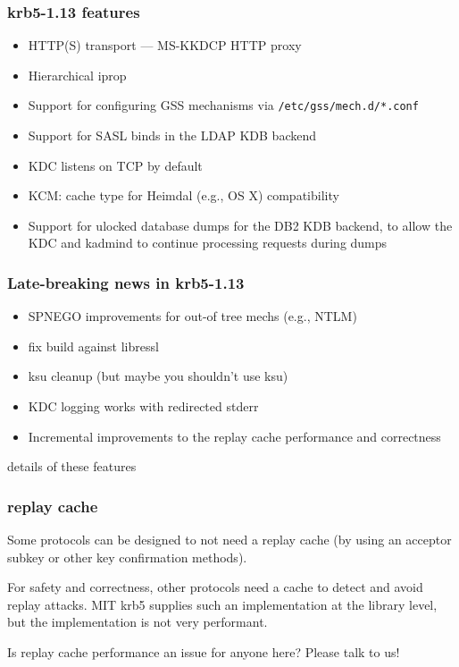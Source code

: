 \documentclass{beamer}
\begin{document}
\begin{frame}[fragile]
\frametitle{krb5-1.13 features}
\begin{itemize}
\item{HTTP(S) transport --- MS-KKDCP HTTP proxy}
\item{Hierarchical iprop}
\item{Support for configuring GSS mechanisms via \verb+/etc/gss/mech.d/*.conf+}
\item{Support for SASL binds in the LDAP KDB backend}
\item{KDC listens on TCP by default}
\item{KCM: cache type for Heimdal (e.g., OS X) compatibility}
\item{Support for ulocked database dumps for the DB2 KDB backend, to allow
	the KDC and kadmind to continue processing requests during dumps}
\end{itemize}
\end{frame}

\begin{frame}
\frametitle{Late-breaking news in krb5-1.13}
\begin{itemize}
\item{SPNEGO improvements for out-of tree mechs (e.g., NTLM)}
\item{fix build against libressl}
\item{ksu cleanup (but maybe you shouldn't use ksu)}
\item{KDC logging works with redirected stderr}
\item{Incremental improvements to the replay cache performance and
	correctness}
\end{itemize}
\end{frame}

\begin{frame}
details of these features
\end{frame}

\begin{frame}
\frametitle{replay cache}
Some protocols can be designed to not need a replay cache (by using
an acceptor subkey or other key confirmation methods).

For safety and correctness, other protocols need a cache to detect and
avoid replay attacks.  MIT krb5 supplies such an implementation at the
library level, but the implementation is not very performant.

Is replay cache performance an issue for anyone here?  Please talk to us!
\end{frame}
\end{document}
